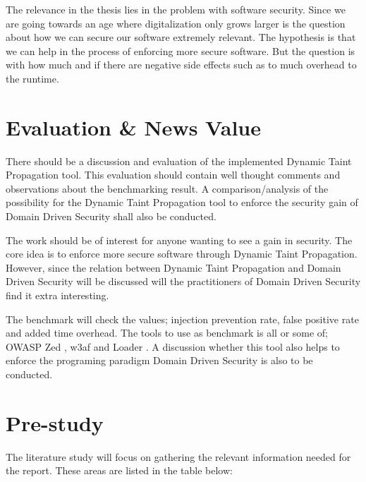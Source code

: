 \documentclass{../kththesis}
\begin{document}
\noindent
The relevance in the thesis lies in the problem with software security. Since we are going towards an age where digitalization only grows larger is the question about how we can secure our software extremely relevant. The hypothesis is that we can help in the process of enforcing more secure software. But the question is with how much and if there are negative side effects such as to much overhead to the runtime.


\chapter{Evaluation \& News Value}
There should be a discussion and evaluation of the implemented Dynamic Taint Propagation tool. This evaluation should contain well thought comments and observations about the benchmarking result. A comparison/analysis of the possibility for the Dynamic Taint Propagation tool to enforce the security gain of Domain Driven Security shall also be conducted. 

The work should be of interest for anyone wanting to see a gain in security. The core idea is to enforce more secure software through Dynamic Taint Propagation. However, since the relation between Dynamic Taint Propagation and Domain Driven Security will be discussed will the practitioners of Domain Driven Security find it extra interesting.




The benchmark will check the values; injection prevention rate, false positive rate and added time overhead. The tools to use as benchmark is all or some of; OWASP Zed \parencite{zed}, w3af \parencite{w3af} and Loader \parencite{loader}. A discussion whether this tool also helps to enforce the programing paradigm Domain Driven Security is also to be conducted.

\chapter{Pre-study}
The literature study will focus on gathering the relevant information needed for the report. These areas are listed in the table below:
	
\end{document}
